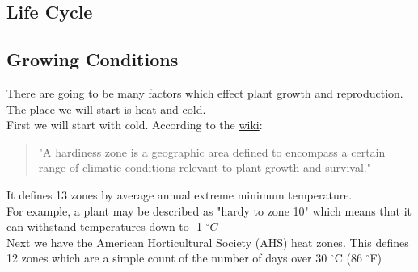\documentclass[10pt]{extarticle}
\begin{document}
\subsection{Life Cycle}

\subsection{Growing Conditions}
There are going to be many factors which effect plant growth and reproduction. The place we will start is heat and cold. \\
First we will start with cold. According to the \href{https://en.wikipedia.org/wiki/Hardiness_zone}{wiki}:
\begin{quote}
	"A hardiness zone is a geographic area defined to encompass a certain range of climatic conditions relevant to plant growth and survival."
\end{quote}
It defines 13 zones by average annual extreme minimum temperature.  \\
For example, a plant may be described as "hardy to zone 10" which means that it can withstand temperatures down to -1 $^{\circ} C$ \\
Next we have the American Horticultural Society (AHS) heat zones. This defines 12 zones which are a simple count of the number of days over 30 $^{\circ}$C (86 $^{\circ}$F)
\end{document}
